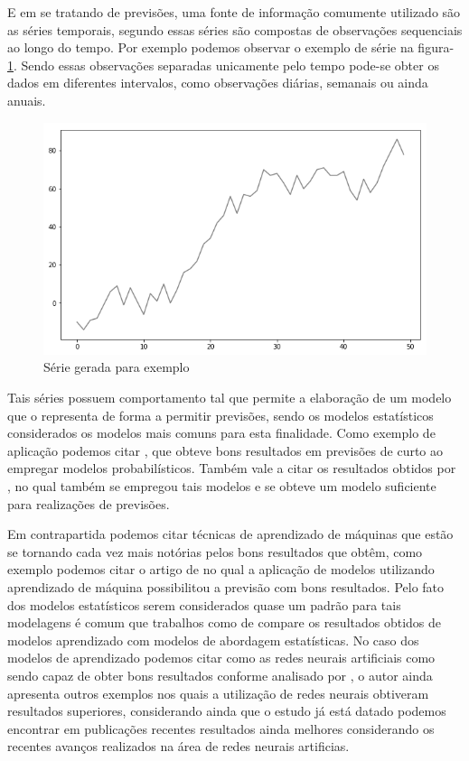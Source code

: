 \documentclass[
	12pt,
	oneside,
	a4paper,
	english,
	brazil
]{abntex2}
\begin{document}
E em se tratando de previsões, uma fonte de informação comumente utilizado são 
as séries temporais, segundo  essas séries são compostas de 
observações sequenciais ao longo do tempo. Por exemplo podemos observar o 
exemplo de série na figura-\ref{serie0}. Sendo essas observações separadas 
unicamente pelo tempo pode-se obter os dados em diferentes intervalos, como 
observações diárias, semanais ou ainda anuais.

\begin{figure}[ht]
    \centering
    \caption{Série gerada para exemplo}\label{serie0}
    \includegraphics[width=.6\linewidth]{images/serie_exemplo.png}
\end{figure}

Tais séries possuem comportamento tal que permite a elaboração de um modelo que 
o representa de forma a permitir previsões, sendo os modelos estatísticos 
considerados os modelos mais comuns para esta finalidade. Como exemplo de 
aplicação podemos citar , que obteve bons resultados em 
previsões de curto ao empregar modelos probabilísticos. Também vale a citar os 
resultados obtidos por , no qual também se empregou tais 
modelos e se obteve um modelo suficiente para realizações de previsões.

Em contrapartida podemos citar técnicas de aprendizado de máquinas que estão se 
tornando cada vez mais notórias pelos bons resultados que obtêm, como exemplo 
podemos citar o artigo de  no qual a aplicação de modelos 
utilizando aprendizado de máquina possibilitou a previsão com bons resultados.  
Pelo fato dos modelos estatísticos serem considerados quase um padrão para tais 
modelagens é comum que trabalhos como de  compare os 
resultados obtidos de modelos aprendizado com modelos de abordagem estatísticas.  
No caso dos modelos de aprendizado podemos citar como as redes neurais 
artificiais como sendo capaz de obter bons resultados conforme analisado por 
, o autor ainda apresenta outros exemplos nos quais a 
utilização de redes neurais obtiveram resultados superiores, considerando ainda 
que o estudo já está datado podemos encontrar em publicações recentes resultados 
ainda melhores considerando os recentes avanços realizados na área de redes 
neurais artificias.
\end{document}
